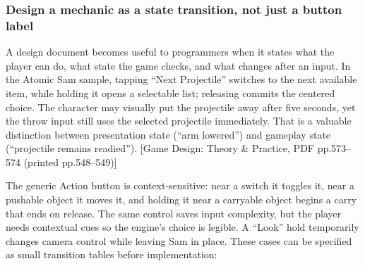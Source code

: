 \subsubsection{Design a mechanic as a state transition, not just a button label}\label{05-engine-i-ch009-design-a-mechanic-as-a-state-transition-not-just-a-button-label}

\hypertarget{05-engine-i-ch009-design-a-mechanic-as-a-state-transition-not-just-a-button-label}{}

A design document becomes useful to programmers when it states what the player can do, what state the game checks, and what changes after an input. In the Atomic Sam sample, tapping ``Next Projectile'' switches to the next available item, while holding it opens a selectable list; releasing commits the centered choice. The character may visually put the projectile away after five seconds, yet the throw input still uses the selected projectile immediately. That is a valuable distinction between presentation state (``arm lowered'') and gameplay state (``projectile remains readied''). {[}Game Design: Theory \& Practice, PDF pp.573--574 (printed pp.548--549){]}

The generic Action button is context-sensitive: near a switch it toggles it, near a pushable object it moves it, and holding it near a carryable object begins a carry that ends on release. The same control saves input complexity, but the player needs contextual cues so the engine's choice is legible. A ``Look'' hold temporarily changes camera control while leaving Sam in place. These cases can be specified as small transition tables before implementation:

